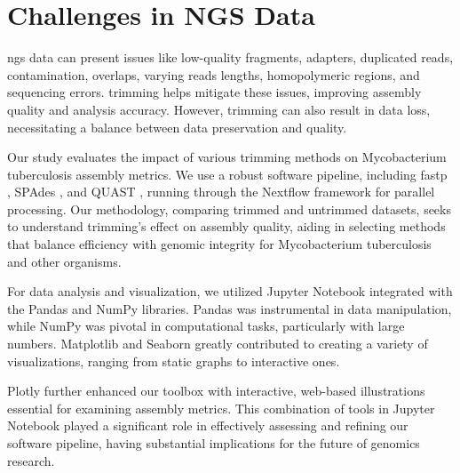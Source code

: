 \section{Challenges in NGS Data}

\gls{ngs} data can present issues like low-quality fragments, adapters, duplicated \gls{read}s, contamination, overlaps, varying \gls{read}s lengths, homopolymeric regions, and sequencing errors. \gls{trimming} helps mitigate these issues, improving \gls{assembly} quality and analysis accuracy. However, \gls{trimming} can also result in data loss, necessitating a balance between data preservation and quality.

Our study evaluates the impact of various \gls{trimming} methods on Mycobacterium tuberculosis \gls{assembly} metrics. We use a robust software pipeline, including fastp \cite{fastp}, SPAdes \cite{spades}, and QUAST \cite{quast}, running through the Nextflow framework \cite{nextflow} for parallel processing. Our methodology, comparing trimmed and untrimmed datasets, seeks to understand \gls{trimming}'s effect on \gls{assembly} quality, aiding in selecting methods that balance efficiency with genomic integrity for Mycobacterium tuberculosis and other organisms.

For data analysis and visualization, we utilized Jupyter Notebook \cite{notebook} integrated with the Pandas \cite{pandas} and NumPy \cite{numpy} libraries. Pandas was instrumental in data manipulation, while NumPy was pivotal in computational tasks, particularly with large numbers. Matplotlib \cite{matplotlib} and Seaborn \cite{seaborn} greatly contributed to creating a variety of visualizations, ranging from static graphs to interactive ones.

Plotly \cite{plotly} further enhanced our toolbox with interactive, web-based illustrations essential for examining \gls{assembly} metrics. This combination of tools in Jupyter Notebook played a significant role in effectively assessing and refining our software pipeline, having substantial implications for the future of genomics research.






